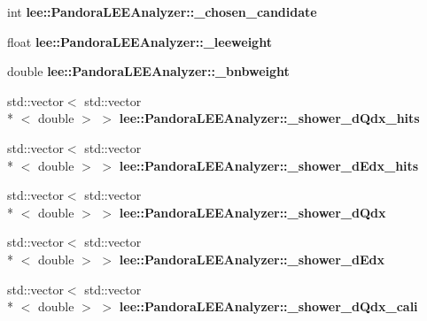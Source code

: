 \begin{DoxyCompactItemize}
\item 
\hypertarget{group__lee_ga258cdf1c3fb847abc6f3aad95f8471d0}{int {\bfseries lee\-::\-Pandora\-L\-E\-E\-Analyzer\-::\-\_\-chosen\-\_\-candidate}}\label{group__lee_ga258cdf1c3fb847abc6f3aad95f8471d0}

\item 
\hypertarget{group__lee_gaeba6b9ecae9a1616394a17189dfe4808}{float {\bfseries lee\-::\-Pandora\-L\-E\-E\-Analyzer\-::\-\_\-leeweight}}\label{group__lee_gaeba6b9ecae9a1616394a17189dfe4808}

\item 
\hypertarget{group__lee_ga9450f1c2fbd4efa3927094f9953c5041}{double {\bfseries lee\-::\-Pandora\-L\-E\-E\-Analyzer\-::\-\_\-bnbweight}}\label{group__lee_ga9450f1c2fbd4efa3927094f9953c5041}

\item 
\hypertarget{group__lee_gaa6b9f1a06dcc4c9b5e7ad66b2a5f3995}{std\-::vector$<$ std\-::vector\\*
$<$ double $>$ $>$ {\bfseries lee\-::\-Pandora\-L\-E\-E\-Analyzer\-::\-\_\-shower\-\_\-d\-Qdx\-\_\-hits}}\label{group__lee_gaa6b9f1a06dcc4c9b5e7ad66b2a5f3995}

\item 
\hypertarget{group__lee_ga8dc5bf5791d750d7481aa6a4051433d3}{std\-::vector$<$ std\-::vector\\*
$<$ double $>$ $>$ {\bfseries lee\-::\-Pandora\-L\-E\-E\-Analyzer\-::\-\_\-shower\-\_\-d\-Edx\-\_\-hits}}\label{group__lee_ga8dc5bf5791d750d7481aa6a4051433d3}

\item 
\hypertarget{group__lee_gaec600c2d05138143cbef4f23c44d92cf}{std\-::vector$<$ std\-::vector\\*
$<$ double $>$ $>$ {\bfseries lee\-::\-Pandora\-L\-E\-E\-Analyzer\-::\-\_\-shower\-\_\-d\-Qdx}}\label{group__lee_gaec600c2d05138143cbef4f23c44d92cf}

\item 
\hypertarget{group__lee_gab709b5ce1a5b80131bd14a57c2e82bf5}{std\-::vector$<$ std\-::vector\\*
$<$ double $>$ $>$ {\bfseries lee\-::\-Pandora\-L\-E\-E\-Analyzer\-::\-\_\-shower\-\_\-d\-Edx}}\label{group__lee_gab709b5ce1a5b80131bd14a57c2e82bf5}

\item 
\hypertarget{group__lee_gaaf81a95a1829c0041e9770be3d09f240}{std\-::vector$<$ std\-::vector\\*
$<$ double $>$ $>$ {\bfseries lee\-::\-Pandora\-L\-E\-E\-Analyzer\-::\-\_\-shower\-\_\-d\-Qdx\-\_\-cali}}\label{group__lee_gaaf81a95a1829c0041e9770be3d09f240}


\end{DoxyCompactItemize}
